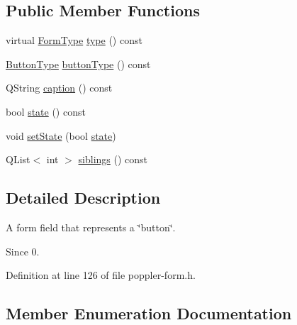 \subsection*{Public Member Functions}
\begin{DoxyCompactItemize}
\item 
virtual \hyperlink{class_poppler_1_1_form_field_af9b28bf05b29780f81445b21a0ed7423}{Form\+Type} \hyperlink{class_poppler_1_1_form_field_button_a2f28ac2dc2ff3e77fac9d4b39a297aad}{type} () const
\item 
\hyperlink{class_poppler_1_1_form_field_button_acb50171e446769665a4c671c73385997}{Button\+Type} \hyperlink{class_poppler_1_1_form_field_button_a7d9f2c025ac21b3b88587a524d394bc6}{button\+Type} () const
\item 
Q\+String \hyperlink{class_poppler_1_1_form_field_button_a85c53178174c56f6da890ac1ed5896e7}{caption} () const
\item 
bool \hyperlink{class_poppler_1_1_form_field_button_ab5906ea323d8a407c8c66253ae280bab}{state} () const
\item 
void \hyperlink{class_poppler_1_1_form_field_button_a8eabbc4f91bcbec292a07206bbbb2b6e}{set\+State} (bool \hyperlink{class_poppler_1_1_form_field_button_ab5906ea323d8a407c8c66253ae280bab}{state})
\item 
Q\+List$<$ int $>$ \hyperlink{class_poppler_1_1_form_field_button_aa63cafeb2c342ebc80d37c8b631a7aac}{siblings} () const
\end{DoxyCompactItemize}


\subsection{Detailed Description}
A form field that represents a \char`\"{}button\char`\"{}.

\begin{DoxySince}{Since}
0. 
\end{DoxySince}


Definition at line 126 of file poppler-\/form.\+h.



\subsection{Member Enumeration Documentation}
\mbox{\label{class_poppler_1_1_form_field_button_acb50171e446769665a4c671c73385997}} 
